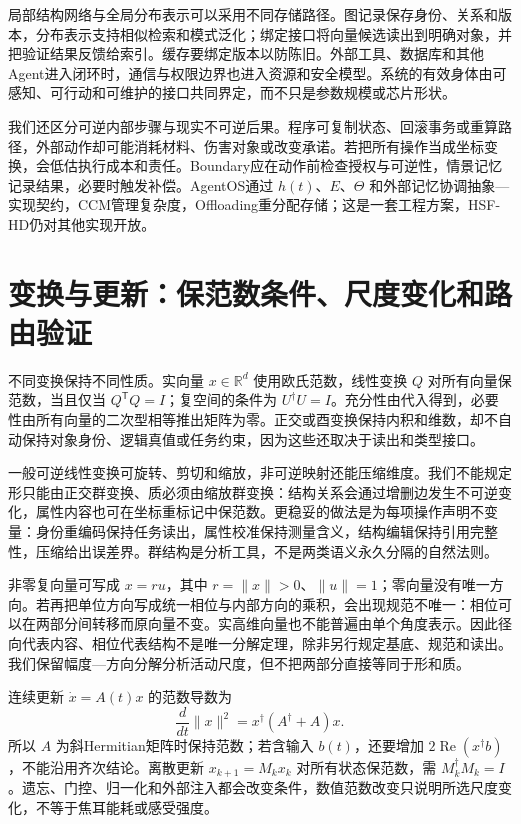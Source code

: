 局部结构网络与全局分布表示可以采用不同存储路径。图记录保存身份、关系和版本，分布表示支持相似检索和模式泛化；绑定接口将向量候选读出到明确对象，并把验证结果反馈给索引。缓存要绑定版本以防陈旧。外部工具、数据库和其他Agent进入闭环时，通信与权限边界也进入资源和安全模型。系统的有效身体由可感知、可行动和可维护的接口共同界定，而不只是参数规模或芯片形状。

我们还区分可逆内部步骤与现实不可逆后果。程序可复制状态、回滚事务或重算路径，外部动作却可能消耗材料、伤害对象或改变承诺。若把所有操作当成坐标变换，会低估执行成本和责任。Boundary应在动作前检查授权与可逆性，情景记忆记录结果，必要时触发补偿。AgentOS通过 $h(t)$、$E$、$\Theta$ 和外部记忆协调抽象—实现契约，CCM管理复杂度，Offloading重分配存储；这是一套工程方案，HSF-HD仍对其他实现开放。

\section{变换与更新：保范数条件、尺度变化和路由验证}
\label{sec:group_theory_morpho_semantics}

不同变换保持不同性质。实向量 $x\in\mathbb R^d$ 使用欧氏范数，线性变换 $Q$ 对所有向量保范数，当且仅当 $Q^{\mathsf T}Q=I$；复空间的条件为 $U^\dagger U=I$。充分性由代入得到，必要性由所有向量的二次型相等推出矩阵为零。正交或酉变换保持内积和维数，却不自动保持对象身份、逻辑真值或任务约束，因为这些还取决于读出和类型接口。

一般可逆线性变换可旋转、剪切和缩放，非可逆映射还能压缩维度。我们不能规定形只能由正交群变换、质必须由缩放群变换：结构关系会通过增删边发生不可逆变化，属性内容也可在坐标重标记中保范数。更稳妥的做法是为每项操作声明不变量：身份重编码保持任务读出，属性校准保持测量含义，结构编辑保持引用完整性，压缩给出误差界。群结构是分析工具，不是两类语义永久分隔的自然法则。

非零复向量可写成 $x=ru$，其中 $r=\|x\|>0$、$\|u\|=1$；零向量没有唯一方向。若再把单位方向写成统一相位与内部方向的乘积，会出现规范不唯一：相位可以在两部分间转移而原向量不变。实高维向量也不能普遍由单个角度表示。因此径向代表内容、相位代表结构不是唯一分解定理，除非另行规定基底、规范和读出。我们保留幅度—方向分解分析活动尺度，但不把两部分直接等同于形和质。

连续更新 $\dot x=A(t)x$ 的范数导数为
\[
\frac d{dt}\|x\|^2=x^\dagger(A^\dagger+A)x.
\]
所以 $A$ 为斜Hermitian矩阵时保持范数；若含输入 $b(t)$，还要增加 $2\operatorname{Re}(x^\dagger b)$，不能沿用齐次结论。离散更新 $x_{k+1}=M_kx_k$ 对所有状态保范数，需 $M_k^\dagger M_k=I$。遗忘、门控、归一化和外部注入都会改变条件，数值范数改变只说明所选尺度变化，不等于焦耳能耗或感受强度。

